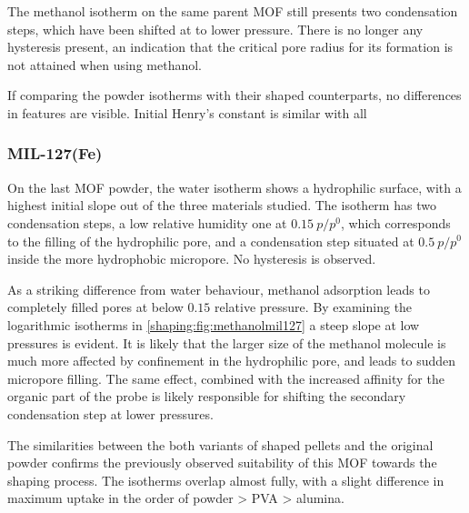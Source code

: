 The methanol isotherm on the same parent MOF still presents 
two condensation steps, which have been shifted at to 
lower pressure. There is no longer any hysteresis present,
an indication that the critical pore radius for its formation
is not attained when using methanol.

If comparing the powder isotherms with their shaped counterparts,
no differences in features are visible. Initial Henry's constant 
is similar with all  

\subsubsection{MIL-127(Fe)}

On the last MOF powder, the water isotherm shows a hydrophilic
surface, with a highest initial slope out of the three 
materials studied. The isotherm has two condensation steps,
a low relative humidity one at \(0.15~p/p^0\), which corresponds
to the filling of the hydrophilic pore, and a condensation 
step situated at \(0.5~p/p^0\) inside the more hydrophobic micropore.
No hysteresis is observed.

As a striking difference from water behaviour, methanol adsorption
leads to completely filled pores at below \(0.15\) relative 
pressure. By examining the logarithmic isotherms in 
\autoref{shaping:fig:methanolmil127} a steep slope at low
pressures is evident. It is likely that the larger size of the
methanol molecule is much more affected by confinement in 
the hydrophilic pore, and leads to sudden micropore filling.
The same effect, combined with the increased affinity for the 
organic part of the probe is likely responsible for shifting the 
secondary condensation step at lower pressures.

The similarities between the both variants of shaped pellets 
and the original powder confirms the previously observed 
suitability of this MOF towards the shaping process. The isotherms
overlap almost fully, with a slight difference in maximum uptake
in the order of powder > PVA > alumina.